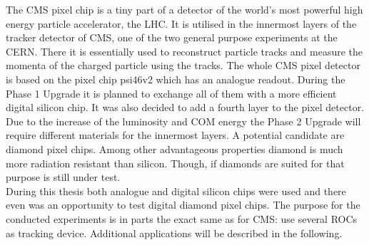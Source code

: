 The CMS pixel chip is a tiny part of a detector of the world's most powerful high energy particle accelerator, the \ac{LHC}. It is utilised in the innermost layers of the tracker detector of \ac{CMS}, one of the two general purpose experiments at the \ac{CERN}. There it is essentially used to reconstruct particle tracks and measure the momenta of the charged particle using the tracks. The whole \ac{CMS} pixel detector is based on the pixel chip psi46v2 which has an analogue readout. During the Phase 1 Upgrade it is planned to exchange all of them with a more efficient digital silicon chip. It was also decided to add a fourth layer to the pixel detector. Due to the increase of the luminosity and \ac{COM} energy the Phase 2 Upgrade will require different materials for the innermost layers. A potential candidate are diamond pixel chips. Among other advantageous properties diamond is much more radiation resistant than silicon. Though, if diamonds are suited for that purpose is still under test.\\
During this thesis both analogue and digital silicon chips were used and there even was an opportunity to test digital diamond pixel chips. The purpose for the conducted experiments is in parts the exact same as for \ac{CMS}: use several \ac{ROC}s as tracking device. Additional applications will be described in the following.
